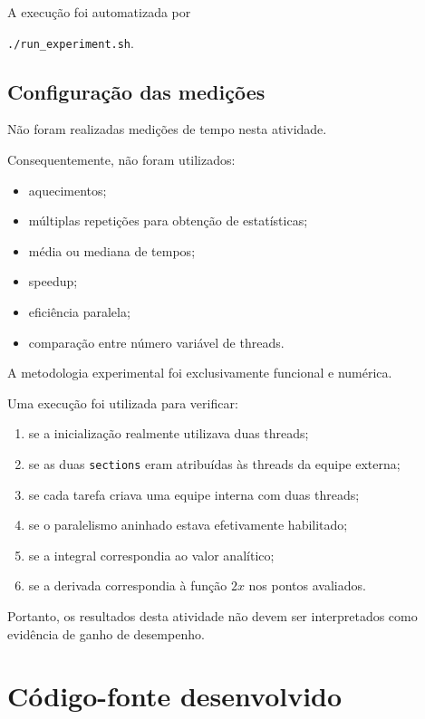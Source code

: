 A execução foi automatizada por

\begin{center}
\texttt{./run\_experiment.sh}.
\end{center}


\subsection{Configuração das medições}

Não foram realizadas medições de tempo nesta atividade.

Consequentemente, não foram utilizados:

\begin{itemize}
    \item aquecimentos;
    \item múltiplas repetições para obtenção de estatísticas;
    \item média ou mediana de tempos;
    \item speedup;
    \item eficiência paralela;
    \item comparação entre número variável de threads.
\end{itemize}

A metodologia experimental foi exclusivamente funcional e numérica.

Uma execução foi utilizada para verificar:

\begin{enumerate}
    \item se a inicialização realmente utilizava duas threads;
    \item se as duas \texttt{sections} eram atribuídas às threads da equipe
    externa;
    \item se cada tarefa criava uma equipe interna com duas threads;
    \item se o paralelismo aninhado estava efetivamente habilitado;
    \item se a integral correspondia ao valor analítico;
    \item se a derivada correspondia à função $2x$ nos pontos avaliados.
\end{enumerate}

Portanto, os resultados desta atividade não devem ser interpretados como
evidência de ganho de desempenho.


\section{Código-fonte desenvolvido}
\label{sec:atvd08-codigo}

